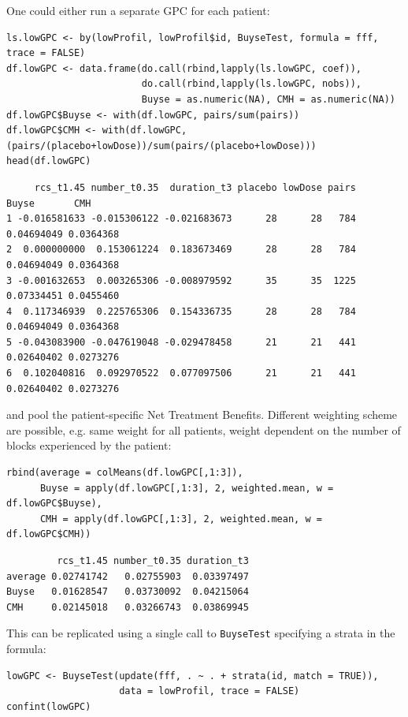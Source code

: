 \documentclass[12pt]{article}
\begin{document}
\noindent One could either run a separate GPC for each patient:
\lstset{language=r,label= ,caption= ,captionpos=b,numbers=none}
\begin{lstlisting}
ls.lowGPC <- by(lowProfil, lowProfil$id, BuyseTest, formula = fff, trace = FALSE)
df.lowGPC <- data.frame(do.call(rbind,lapply(ls.lowGPC, coef)),
                        do.call(rbind,lapply(ls.lowGPC, nobs)),
                        Buyse = as.numeric(NA), CMH = as.numeric(NA))
df.lowGPC$Buyse <- with(df.lowGPC, pairs/sum(pairs))
df.lowGPC$CMH <- with(df.lowGPC, (pairs/(placebo+lowDose))/sum(pairs/(placebo+lowDose)))
head(df.lowGPC)
\end{lstlisting}

\begin{verbatim}
     rcs_t1.45 number_t0.35  duration_t3 placebo lowDose pairs      Buyse       CMH
1 -0.016581633 -0.015306122 -0.021683673      28      28   784 0.04694049 0.0364368
2  0.000000000  0.153061224  0.183673469      28      28   784 0.04694049 0.0364368
3 -0.001632653  0.003265306 -0.008979592      35      35  1225 0.07334451 0.0455460
4  0.117346939  0.225765306  0.154336735      28      28   784 0.04694049 0.0364368
5 -0.043083900 -0.047619048 -0.029478458      21      21   441 0.02640402 0.0273276
6  0.102040816  0.092970522  0.077097506      21      21   441 0.02640402 0.0273276
\end{verbatim}


\noindent and pool the patient-specific Net Treatment
Benefits. Different weighting scheme are possible, e.g. same weight
for all patients, weight dependent on the number of blocks experienced
by the patient:
\lstset{language=r,label= ,caption= ,captionpos=b,numbers=none}
\begin{lstlisting}
rbind(average = colMeans(df.lowGPC[,1:3]),
      Buyse = apply(df.lowGPC[,1:3], 2, weighted.mean, w = df.lowGPC$Buyse),
      CMH = apply(df.lowGPC[,1:3], 2, weighted.mean, w = df.lowGPC$CMH))
\end{lstlisting}

\begin{verbatim}
         rcs_t1.45 number_t0.35 duration_t3
average 0.02741742   0.02755903  0.03397497
Buyse   0.01628547   0.03730092  0.04215064
CMH     0.02145018   0.03266743  0.03869945
\end{verbatim}


This can be replicated using a single call to \texttt{BuyseTest} specifying a
strata in the formula:
\lstset{language=r,label= ,caption= ,captionpos=b,numbers=none}
\begin{lstlisting}
lowGPC <- BuyseTest(update(fff, . ~ . + strata(id, match = TRUE)),
                    data = lowProfil, trace = FALSE)
confint(lowGPC)
\end{lstlisting}
\end{document}
